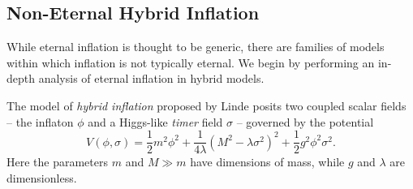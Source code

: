 
\subsection{Non-Eternal Hybrid Inflation}

While eternal inflation is thought to be generic, there are families of models within which inflation is not typically eternal.  We begin by performing an in-depth analysis of eternal inflation in hybrid models.





The model of {\it hybrid inflation} proposed by Linde \cite{linde1994hybrid} 
posits two coupled scalar fields -- the inflaton $\phi$ and a Higgs-like {\it timer} field $\sigma$ -- governed by the potential
\begin{equation} V(\phi,\sigma) = \frac12{m^2} \phi^2 + \frac1{4\lambda} (M^2 - \lambda \sigma^2)^2 + \frac12{g^2} \phi^2 \sigma^2. \label{pot} \end{equation}
Here the parameters $m$ and $M \gg m$ have dimensions of mass, while $g$ and $\lambda$ are dimensionless.  


